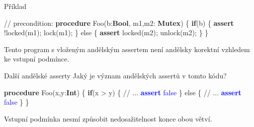 \documentclass[11pt]{beamer}
\begin{document}


% 
\begin{frame}[fragile]{Příklad}
\begin{semiverbatim} \small
// precondition: 
\textbf{procedure} Foo(b:\textbf{Bool}, m1,m2: \textbf{Mutex}) \{ \pause
{}
  \textbf{if}(b) \{
    \textbf{assert} !locked(m1); lock(m1);
  \} else \{
    \textbf{assert} locked(m2); unlock(m2);
  \}
\}
\end{semiverbatim}
Tento program s vloženým andělským assertem není
andělsky korektní vzhledem ke vstupní podmínce.
\end{frame}


\begin{frame}[fragile]{Další andělské asserty}
Jaký je význam andělských assertů v tomto kódu?
\begin{semiverbatim}
\textbf{procedure} Foo(x,y:\textbf{Int}) \{
  \textbf{if}(x > y) \{
    // ...
    \textcolor{blue}{\textbf{assert} false}
  \} else \{
    // ...
    \textcolor{blue}{\textbf{assert} false}
  \}
\}
\end{semiverbatim}
\pause Vstupní podmínka nesmí způsobit nedosažitelnost konce obou větví.
\end{frame}
\end{document}
